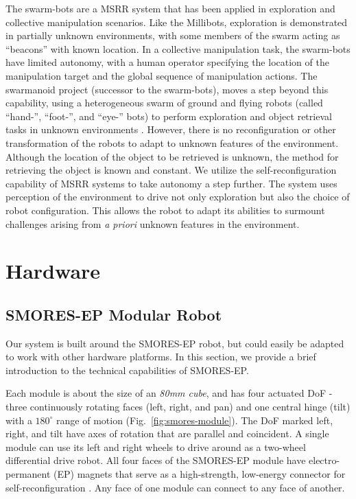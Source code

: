 \documentclass[conference]{IEEEtran}
\begin{document}
The swarm-bots are a MSRR system that has been applied in exploration \cite{Dorigo2005} and collective manipulation \cite{Mondada2005} scenarios.  Like the Millibots, exploration is demonstrated in partially unknown environments, with some members of the swarm acting as ``beacons'' with known location.  In a collective manipulation task, the swarm-bots have limited autonomy, with a human operator specifying the location of the manipulation target and the global sequence of manipulation actions. The swarmanoid project (successor to the swarm-bots), moves a step beyond this capability, using a heterogeneous swarm of ground and flying robots (called ``hand-'', ``foot-'', and ``eye-'' bots) to perform exploration and object retrieval tasks in unknown environments \cite{Dorigo2013}.  However, there is no reconfiguration or other transformation of the robots to adapt to unknown features of the environment. Although the location of the object to be retrieved is unknown, the method for retrieving the object is known and constant. We utilize the self-reconfiguration capability of MSRR systems to take autonomy a step further. The system uses perception of the environment to drive not only exploration but also the choice of robot configuration. This allows the robot to adapt its abilities to surmount challenges arising from \textit{a priori} unknown features in the environment.


\section{Hardware} %
\label{sec:hardware}
%
\subsection{SMORES-EP Modular Robot} \label{sec:smores}
%
Our system is built around the SMORES-EP robot, but could easily be adapted to
work with other hardware platforms.  In this section, we provide a brief
introduction to the technical capabilities of SMORES-EP.

Each module is about the size of an \textit{80mm cube}, and has four actuated DoF - three continuously rotating faces (left, right, and
pan)  and one central hinge (tilt) with a \(180^\circ\) range of motion
(Fig.~\ref{fig:smores-module}). The DoF marked left, right, and tilt  have
 axes of rotation that are parallel and coincident. A single module can use its
left and right wheels to drive around as a two-wheel differential drive robot.
All four faces of the SMORES-EP module have electro-permanent (EP) magnets
that serve as a high-strength, low-energy connector for self-reconfiguration
\cite{tosun2016design}.  Any face of one module can connect to any face of
another.
\end{document}
